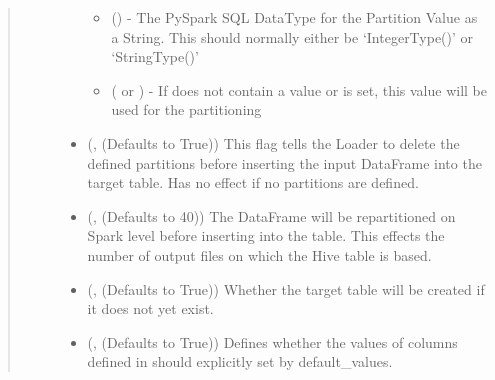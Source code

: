 \documentclass[a4paper,10pt, twoside,english]{sphinxmanual}
\begin{document}
\begin{fulllineitems}
\begin{quote}
\begin{description}
\begin{itemize}
\begin{itemize}
\item {} 
 () - The PySpark SQL DataType for the Partition Value as
a String. This should normally either be ‘IntegerType()’ or ‘StringType()’

\item {} 
 ( or ) - If  does not contain
a value or  is set, this value will be used for the
partitioning

\end{itemize}


\item {} 
 (, (Defaults to True)) \textendash{} This flag tells the Loader to delete the defined partitions before
inserting the input DataFrame into the target table. Has no effect if no partitions are
defined.

\item {} 
 (, (Defaults to 40)) \textendash{} The DataFrame will be repartitioned on Spark level before inserting into the table.
This effects the number of output files on which the Hive table is based.

\item {} 
 (, (Defaults to True)) \textendash{} Whether the target table will be created if it does not yet exist.

\item {} 
 (, (Defaults to True)) \textendash{} Defines whether the values of columns defined in  should
explicitly set by default\_values.


\end{itemize}
\end{description}
\end{quote}
\end{fulllineitems}
\end{document}
